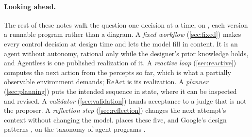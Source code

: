 \paragraph{Looking ahead.}
The rest of these notes walk the question one decision at a time, on \msa{}, each version a
runnable program rather than a diagram. A \emph{fixed workflow} (\cref{sec:fixed}) makes every
control decision at design time and lets the model fill in content. It is an agent without
autonomy, rational only while the designer's prior knowledge holds, and Agentless
\citep{xia2025agentless} is one published realization of it. A \emph{reactive loop}
(\cref{sec:reactive}) computes the next action from the percepts so far, which is what a
partially observable environment demands; ReAct \citep{yao2023react} is its realization. A
\emph{planner} (\cref{sec:planning}) puts the intended sequence in state, where it can be
inspected and revised. A \emph{validator} (\cref{sec:validation}) hands acceptance to a judge
that is not the proposer. A \emph{reflection step} (\cref{sec:reflection}) changes the next
attempt's context without changing the model.  places these five, and
Google's design patterns \citep{google2026patterns}, on the taxonomy of agent programs
\citep[\S2.4]{russell2020aima}.
